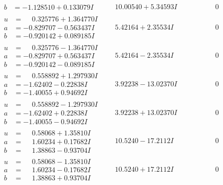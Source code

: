 \documentclass[1p]{elsarticle_modified}
\theoremstyle{definition}
\begin{document}
$$\begin{array}{c|c|c}
\begin{aligned}
b &= -1.128510 + 0.133079 I\end{aligned}
 & \phantom{-}10.00540 + 5.34593 I & \phantom{-0.000000 } 0 \\ \hline\begin{aligned}
u &= \phantom{-}0.325776 + 1.364770 I \\
a &= -0.829707 - 0.563437 I \\
b &= -0.920142 + 0.089185 I\end{aligned}
 & \phantom{-}5.42164 + 2.35534 I & \phantom{-0.000000 } 0 \\ \hline\begin{aligned}
u &= \phantom{-}0.325776 - 1.364770 I \\
a &= -0.829707 + 0.563437 I \\
b &= -0.920142 - 0.089185 I\end{aligned}
 & \phantom{-}5.42164 - 2.35534 I & \phantom{-0.000000 } 0 \\ \hline\begin{aligned}
u &= \phantom{-}0.558892 + 1.297930 I \\
a &= -1.62402 - 0.22838 I \\
b &= -1.40055 + 0.94692 I\end{aligned}
 & \phantom{-}3.92238 - 13.02370 I & \phantom{-0.000000 } 0 \\ \hline\begin{aligned}
u &= \phantom{-}0.558892 - 1.297930 I \\
a &= -1.62402 + 0.22838 I \\
b &= -1.40055 - 0.94692 I\end{aligned}
 & \phantom{-}3.92238 + 13.02370 I & \phantom{-0.000000 } 0 \\ \hline\begin{aligned}
u &= \phantom{-}0.58068 + 1.35810 I \\
a &= \phantom{-}1.60234 + 0.17682 I \\
b &= \phantom{-}1.38863 - 0.93704 I\end{aligned}
 & \phantom{-}10.5240 - 17.2112 I & \phantom{-0.000000 } 0 \\ \hline\begin{aligned}
u &= \phantom{-}0.58068 - 1.35810 I \\
a &= \phantom{-}1.60234 - 0.17682 I \\
b &= \phantom{-}1.38863 + 0.93704 I\end{aligned}
 & \phantom{-}10.5240 + 17.2112 I & \phantom{-0.000000 } 0 \\ \hline\begin{aligned}

\end{aligned}
\end{array}$$
\end{document}
